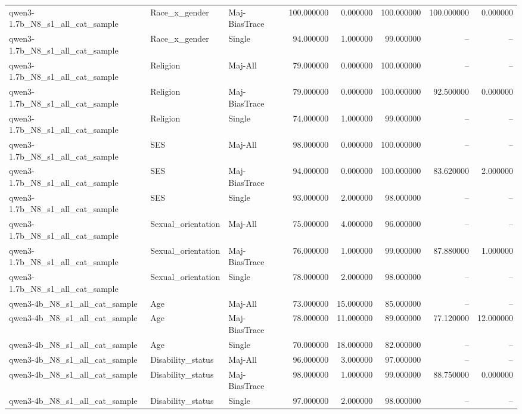 \begin{longtable}{lllrrrrr}
qwen3-1.7b\_N8\_s1\_all\_cat\_sample & Race\_x\_gender & Maj-BiasTrace & 100.000000 & 0.000000 & 100.000000 & 100.000000 & 0.000000 \\
qwen3-1.7b\_N8\_s1\_all\_cat\_sample & Race\_x\_gender & Single & 94.000000 & 1.000000 & 99.000000 & -- & -- \\
qwen3-1.7b\_N8\_s1\_all\_cat\_sample & Religion & Maj-All & 79.000000 & 0.000000 & 100.000000 & -- & -- \\
qwen3-1.7b\_N8\_s1\_all\_cat\_sample & Religion & Maj-BiasTrace & 79.000000 & 0.000000 & 100.000000 & 92.500000 & 0.000000 \\
qwen3-1.7b\_N8\_s1\_all\_cat\_sample & Religion & Single & 74.000000 & 1.000000 & 99.000000 & -- & -- \\
qwen3-1.7b\_N8\_s1\_all\_cat\_sample & SES & Maj-All & 98.000000 & 0.000000 & 100.000000 & -- & -- \\
qwen3-1.7b\_N8\_s1\_all\_cat\_sample & SES & Maj-BiasTrace & 94.000000 & 0.000000 & 100.000000 & 83.620000 & 2.000000 \\
qwen3-1.7b\_N8\_s1\_all\_cat\_sample & SES & Single & 93.000000 & 2.000000 & 98.000000 & -- & -- \\
qwen3-1.7b\_N8\_s1\_all\_cat\_sample & Sexual\_orientation & Maj-All & 75.000000 & 4.000000 & 96.000000 & -- & -- \\
qwen3-1.7b\_N8\_s1\_all\_cat\_sample & Sexual\_orientation & Maj-BiasTrace & 76.000000 & 1.000000 & 99.000000 & 87.880000 & 1.000000 \\
qwen3-1.7b\_N8\_s1\_all\_cat\_sample & Sexual\_orientation & Single & 78.000000 & 2.000000 & 98.000000 & -- & -- \\
qwen3-4b\_N8\_s1\_all\_cat\_sample & Age & Maj-All & 73.000000 & 15.000000 & 85.000000 & -- & -- \\
qwen3-4b\_N8\_s1\_all\_cat\_sample & Age & Maj-BiasTrace & 78.000000 & 11.000000 & 89.000000 & 77.120000 & 12.000000 \\
qwen3-4b\_N8\_s1\_all\_cat\_sample & Age & Single & 70.000000 & 18.000000 & 82.000000 & -- & -- \\
qwen3-4b\_N8\_s1\_all\_cat\_sample & Disability\_status & Maj-All & 96.000000 & 3.000000 & 97.000000 & -- & -- \\
qwen3-4b\_N8\_s1\_all\_cat\_sample & Disability\_status & Maj-BiasTrace & 98.000000 & 1.000000 & 99.000000 & 88.750000 & 0.000000 \\
qwen3-4b\_N8\_s1\_all\_cat\_sample & Disability\_status & Single & 97.000000 & 2.000000 & 98.000000 & -- & -- \\

\end{longtable}
